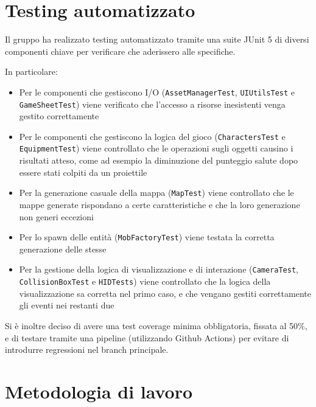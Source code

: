 \documentclass[a4paper,12pt]{report}
\begin{document}
    \section{Testing automatizzato}
    \par Il gruppo ha realizzato testing automatizzato tramite una suite JUnit 5 di diversi componenti chiave
    per verificare che aderissero alle specifiche.
    \par In particolare:
    \begin{itemize}
        \item Per le componenti che gestiscono I/O (\texttt{AssetManagerTest}, \texttt{UIUtilsTest} e \texttt{GameSheetTest}) viene verificato che l'accesso a risorse inesistenti venga gestito correttamente
        \item Per le componenti che gestiscono la logica del gioco (\texttt{CharactersTest} e \texttt{EquipmentTest}) viene controllato che le operazioni sugli oggetti causino i risultati atteso, come ad esempio la diminuzione del punteggio salute dopo essere stati colpiti da un proiettile
        \item Per la generazione casuale della mappa (\texttt{MapTest}) viene controllato che le mappe generate rispondano a certe caratteristiche e che la loro generazione non generi eccezioni
        \item Per lo spawn delle entità (\texttt{MobFactoryTest}) viene testata la corretta generazione delle stesse
        \item Per la gestione della logica di visualizzazione e di interazione (\texttt{CameraTest}, \texttt{CollisionBoxTest} e \texttt{HIDTests}) viene controllato che la logica della visualizzazione sa corretta nel primo caso, e che vengano gestiti correttamente gli eventi nei restanti due
    \end{itemize}
    \par Si è inoltre deciso di avere una test coverage minima obbligatoria, fissata al 50\%, e di testare tramite una pipeline (utilizzando Github Actions) per evitare di introdurre regressioni nel branch principale.
    \section{Metodologia di lavoro}
\end{document}
